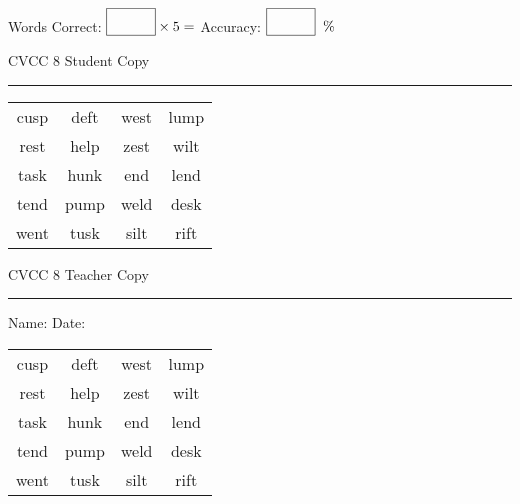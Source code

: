 \documentclass{memoir}
\begin{document}
\small

Words Correct: $\fbox{\phantom{\huge 100}} \times 5 = $ Accuracy: $\fbox{\phantom{\huge 100}}\;\; \%$ 

\vfill

\newpage


\footnotesize \noindent
CVCC 8 \hfill Student Copy
\smallskip
\hrule

\Large

\setlength{\tabcolsep}{14pt}
\def\arraystretch{3}

{\selectfont


\begin{vplace}[0.5]
\begin{center}
\begin{tabular}{cccc}
cusp & deft & west & lump \\
rest & help & zest & wilt \\
task & hunk & end & lend \\
tend & pump & weld & desk \\
went & tusk & silt & rift \\
\end{tabular}
\end{center}
\end{vplace}

}

\newpage

\footnotesize \noindent
CVCC 8 \hfill Teacher Copy
\smallskip
\hrule

\small

\vfill

\noindent
Name: \underline{\hspace{1.75in}} \hfill Date: \underline{\hspace{1in}}

\Large

{\selectfont


\begin{vplace}[0.5]
\begin{center}
\begin{tabular}{cccc}
cusp & deft & west & lump \\
rest & help & zest & wilt \\
task & hunk & end & lend \\
tend & pump & weld & desk \\
went & tusk & silt & rift \\
\end{tabular}
\end{center}
\end{vplace}



}
\end{document}
